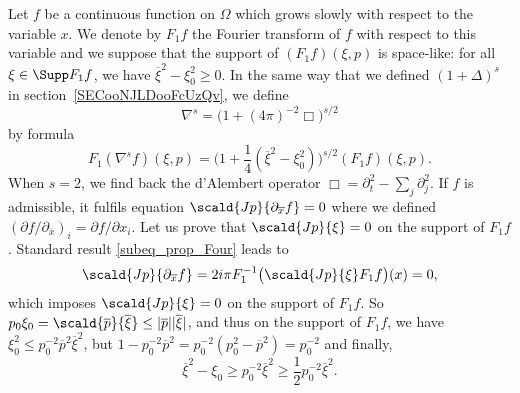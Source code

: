 Let $f$ be a continuous function on $\Omega$ which grows slowly with respect to the variable $x$. We denote by $F_1f$ the Fourier transform of $f$ with respect to this variable and we suppose that the support of $(F_1f)(\xi,p)$ is space-like: for all $\xi\in\Supp F_1f$, we have $\overline{ \xi }^2-\xi_0^2\geq0$. In the same way that we defined $(1+\Delta)^s$ in section~\ref{SECooNJLDooFcUzQv}, we define
\[
  \nabla^s=\big( 1+(4\pi)^{-2}\Box \big)^{s/2}
\]
by formula
\begin{equation}
  F_1(\nabla^sf)(\xi,p)=\big( 1+\frac{ 1 }{ 4 }(\overline{ \xi }^2-\xi_0^2) \big)^{s/2}(F_1f)(\xi,p).
\end{equation}
When $s=2$, we find back the d'Alembert operator $\Box=\partial_t^2-\sum_j\partial_j^2$. If $f$ is admissible, it fulfils equation $\scald{ Jp }{ \partial_{\overline{x}}f }=0$ where we defined $(\partial f/\partial_{\overline{x}})_i=\partial f/\partial x_i$. Let us prove that $\scald{ Jp }{ \xi }=0$ on the support of $F_1f$.	Standard result \eqref{subeq_prop_Four} leads to
\[
  \scald{ Jp }{ \partial_{\overline{x}}f }=2i\pi F_1^{-1}\big( \scald{ Jp }{ \xi }F_1f \big)(x)=0,
\]
which imposes $\scald{ Jp }{ \xi }=0$ on the support of $F_1f$. So $p_0\xi_0=\scald{ \overline{p} }{ \overline{\xi}}\leq| \overline{p} | |\overline{\xi} |$, and thus on the support of $F_1f$, we have $\xi_0^2\leq p_0^{-2}\overline{p}^2\overline{\xi}^2$, but $1-p_0^{-2}\overline{p}^2=p_0^{-2}(p_0^2-\overline{p}^2)=p_0^{-2}$ and finally,
\[
  \overline{\xi}^2-\xi_0\geq p_0^{-2}\overline{\xi}^2\geq\frac{ 1 }{2}p_0^{-2}\overline{\xi}^2.
\]
